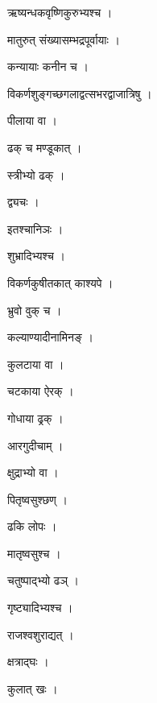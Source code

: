 \documentclass[10pt, openany]{book}
\begin{document}
\noindent ऋष्यन्धकवृष्णिकुरुभ्यश्च ।

\noindent मातुरुत् संख्यासम्भद्रपूर्वायाः ।

\noindent कन्यायाः कनीन च ।

\noindent विकर्णशुङ्गच्छगलाद्वत्सभरद्वाजात्रिषु ।

\noindent पीलाया वा ।

\noindent ढक् च मण्डूकात् ।

\noindent स्त्रीभ्यो ढक् ।

\noindent द्व्यचः ।

\noindent इतश्चानिञः ।

\noindent शुभ्रादिभ्यश्च ।

\noindent विकर्णकुषीतकात् काश्यपे ।

\noindent भ्रुवो वुक् च ।

\noindent कल्याण्यादीनामिनङ् ।

\noindent कुलटाया वा ।

\noindent चटकाया ऐरक् ।

\noindent गोधाया ढ्रक् ।

\noindent आरगुदीचाम् ।

\noindent क्षुद्राभ्यो वा ।

\noindent पितृष्वसुश्छण् ।

\noindent ढकि लोपः ।

\noindent मातृष्वसुश्च ।

\noindent चतुष्पाद्भ्यो ढञ् ।

\noindent गृष्ट्यादिभ्यश्च ।

\noindent राजश्वशुराद्यत् ।

\noindent क्षत्राद्घः ।

\noindent कुलात् खः ।
\end{document}
